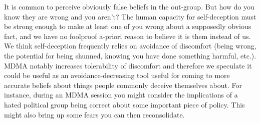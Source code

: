 \documentclass[12pt,letterpaper]{book}
\begin{document}
It is common to perceive obviously false beliefs in the out-group. But how do you know they are wrong and you aren't? The human capacity for self-deception must be strong enough to make at least one of you wrong about a supposedly obvious fact, and we have no foolproof a-priori reason to believe it is them instead of us. We think self-deception frequently relies on avoidance of discomfort (being wrong, the potential for being shunned, knowing you have done something harmful, etc.). MDMA notably increases tolerability of discomfort and therefore we speculate it could be useful as an avoidance-decreasing tool useful for coming to more accurate beliefs about things people commonly deceive themselves about. For instance, during an MDMA session you might consider the implications of a hated political group being correct about some important piece of policy. This might also bring up some fears you can then reconsolidate.
\end{document}
